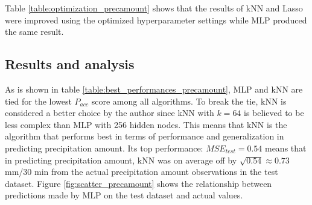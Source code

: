 	Table \ref{table:optimization_precamount} shows that the results of kNN and Lasso were improved using the optimized hyperparameter settings while MLP produced the same result.

	\subsection{Results and analysis} \label{sec:results_precamount}

	\begin{table}[H]
		\centering
		\caption{Shows the overall optimized settings and performances for each of the algorithms in predicting precipitation amount. The best performing algorithms are highlighted. }
	\end{table}

	As is shown in table \ref{table:best_performances_precamount}, MLP and kNN are tied for the lowest $P_{acc}$ score among all algorithms. To break the tie, kNN is considered a better choice by the author since kNN with $k=64$ is believed to be less complex than MLP with 256 hidden nodes. This means that kNN is the algorithm that performs best in terms of performance and generalization in predicting precipitation amount. Its top performance:  $MSE_{test} = 0.54$ means that in predicting precipitation amount, kNN was on average off by $\sqrt{0.54} \approx 0.73$ mm/30 min from the actual precipitation amount observations in the test dataset. Figure \ref{fig:scatter_precamount} shows the relationship between predictions made by MLP on the test dataset and actual values. %

